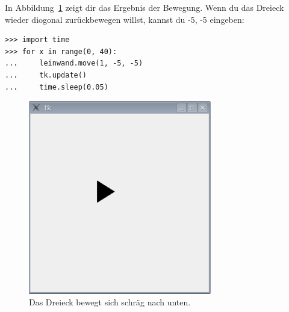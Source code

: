 In Abbildung~\ref{fig45} zeigt dir das Ergebnis der Bewegung. Wenn du das Dreieck wieder diogonal zurückbewegen willst, kannst du -5, -5 eingeben:

\begin{Verbatim}[frame=single]
>>> import time
>>> for x in range(0, 40):
...     leinwand.move(1, -5, -5)
...     tk.update()
...     time.sleep(0.05)
\end{Verbatim}

\begin{figure}
\begin{center}
\includegraphics[width=80mm]{images/figure45}
\end{center}
\caption{Das Dreieck bewegt sich schräg nach unten.}\label{fig45}
\end{figure}

